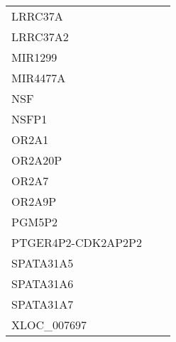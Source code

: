 \begin{tabular}{lcc}
LRRC37A            &                &            \\
LRRC37A2           &                &            \\
MIR1299            &                &            \\
MIR4477A           &                &            \\
NSF                &                &            \\
NSFP1              &                &            \\
OR2A1              &                &            \\
OR2A20P            &                &            \\
OR2A7              &                &            \\
OR2A9P             &                &            \\
PGM5P2             &                &            \\
PTGER4P2-CDK2AP2P2 &                &            \\
SPATA31A5          &                &            \\
SPATA31A6          &                &            \\
SPATA31A7          &                &            \\
XLOC\_007697        &                &            \\
\bottomrule
\end{tabular}
